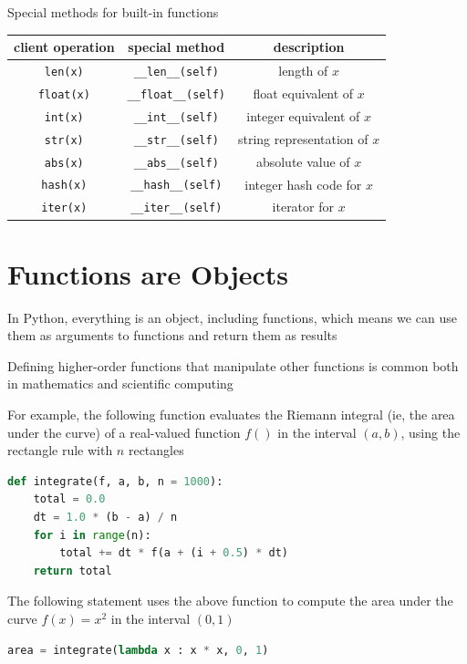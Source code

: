 \documentclass[8pt,a4paper,compress]{beamer}
\begin{document}
\begin{frame}[fragile]
\pause

Special methods for built-in functions
\begin{center}
\begin{tabular}{ccc}
client operation & special method & description \\ \hline
\lstinline$len(x)$ & \lstinline$__len__(self)$ & length of $x$ \\
\lstinline$float(x)$ & \lstinline$__float__(self)$ & float equivalent of $x$ \\
\lstinline$int(x)$ & \lstinline$__int__(self)$ & integer equivalent of $x$ \\
\lstinline$str(x)$ & \lstinline$__str__(self)$ & string representation of $x$ \\
\lstinline$abs(x)$ & \lstinline$__abs__(self)$ & absolute value of $x$ \\
\lstinline$hash(x)$ & \lstinline$__hash__(self)$ & integer hash code for $x$ \\
\lstinline$iter(x)$ & \lstinline$__iter__(self)$ & iterator for $x$
\end{tabular} 
\end{center}
\end{frame}

\section{Functions are Objects}
\begin{frame}[fragile]
\pause

In Python, everything is an object, including functions, which means we can use them as arguments to functions and return them as results

\pause
\bigskip

Defining higher-order functions that manipulate other functions is common both in mathematics and scientific computing

\pause
\bigskip

For example, the following function evaluates the Riemann integral (ie, the area under the curve) of a real-valued function $f()$ in the interval $(a, b)$, using the rectangle rule with $n$ rectangles

\begin{lstlisting}[language=Python,style=focusin]
def integrate(f, a, b, n = 1000):
    total = 0.0
    dt = 1.0 * (b - a) / n
    for i in range(n):
        total += dt * f(a + (i + 0.5) * dt)
    return total
\end{lstlisting}

\pause
\bigskip

The following statement uses the above function to compute the area under the curve $f(x)=x^2$ in the interval $(0, 1)$

\begin{lstlisting}[language=Python,style=focusin]
area = integrate(lambda x : x * x, 0, 1)
\end{lstlisting}
\end{frame}
\end{document}
